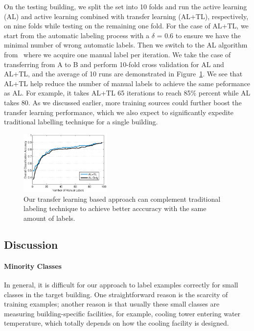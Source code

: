 On the testing building, we split the set into 10 folds and run the active learning (AL) and active learning combined with transfer learning (AL+TL), respectively, on nine folds while testing on the remaining one fold.
For the case of AL+TL, we start from the automatic labeling process with a $\delta$ = 0.6 to ensure we have the minimal number of wrong automatic labels. Then we switch to the AL algorithm from~\cite{cikm} where we acquire one manual label per iteration.
We take the case of transferring from A to B and perform 10-fold cross validation for AL and AL+TL, and the average of 10 runs are demonstrated in Figure~\ref{fig:comp}. 
We see that AL+TL help reduce the number of manual labels to achieve the same peformance as AL.
For example, it takes AL+TL 65 iterations to reach 85\% percent while AL takes 80.
As we discussed earlier, more training sources could further boost the transfer learning performance, which we also expect to significantly expedite traditional labelling technique for a single building.

\begin{figure}[t]
\centering
\includegraphics[width=0.4\textwidth]{./fig/tl_al.eps}
\caption{Our transfer learning based approach can complement traditional labeling technique to achieve better acccuracy with the same amount of labels.}
\label{fig:comp}
\end{figure}


\subsection{Discussion}
\paragraph{Minority Classes} In general, it is difficult for our approach to label examples correctly for small classes in the target building. One straightforward reason is the scarcity of training examples; another reason is that usually these small classes are measuring building-specific facilities, for example, cooling tower entering water temperature, which totally depends on how the cooling facility is designed.

